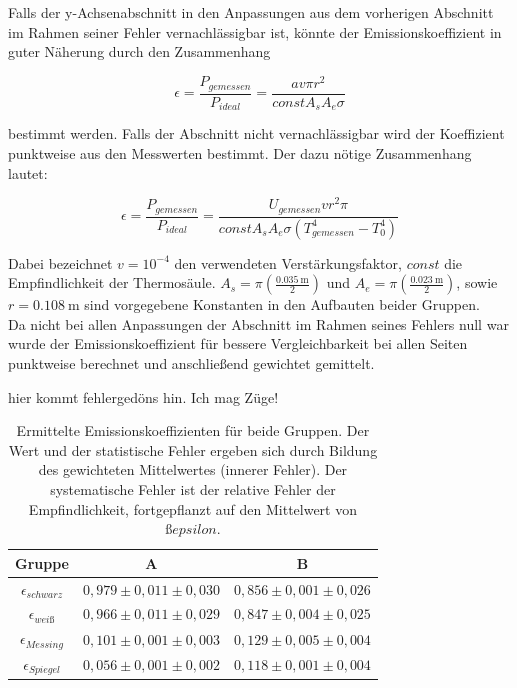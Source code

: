 \documentclass[12pt,a4paper]{article}
\begin{document}
Falls der y-Achsenabschnitt in den Anpassungen aus dem vorherigen Abschnitt im Rahmen seiner Fehler vernachlässigbar ist, könnte der Emissionskoeffizient in guter Näherung durch den Zusammenhang

\begin{equation}
\epsilon = \frac{P_{gemessen}}{P_{ideal}} = \frac{a v \pi r^2}{const A_s A_e \sigma}
\end{equation}

bestimmt werden. Falls der Abschnitt nicht vernachlässigbar wird 
der Koeffizient punktweise aus den Messwerten bestimmt. Der dazu nötige Zusammenhang lautet:

\begin{equation}
\epsilon = \frac{P_{gemessen}}{P_{ideal}} = \frac{U_{gemessen}vr^2 \pi}{const A_s A_e \sigma (T_{gemessen}^4-T_0^4)}
\end{equation}

Dabei bezeichnet $v = 10^{-4}$ den verwendeten Verstärkungsfaktor, $const$ die Empfindlichkeit der Thermosäule. $A_s = \pi \left(\frac{\SI{0,035}{\m}}{2}\right)$ und $A_e = \pi \left(\frac{\SI{0,023}{\m}}{2}\right)$, sowie $r = \SI{0,108}{\m}$ sind vorgegebene Konstanten in den Aufbauten beider Gruppen.\\

Da nicht bei allen Anpassungen der Abschnitt im Rahmen seines Fehlers null war wurde der Emissionskoeffizient für bessere Vergleichbarkeit bei allen Seiten punktweise berechnet und anschließend gewichtet gemittelt.

hier kommt fehlergedöns hin. Ich mag Züge!


\begin{table}
\centering
\begin{tabular}{|c|c|c|}
\hline
Gruppe & A & B \\
\hline
$\epsilon_{schwarz}$ & $ 0,979 \pm 0,011 \pm 0,030 $ & $ 0,856 \pm 0,001 \pm 0,026 $ \\
\hline
$\epsilon_{weiß}$ & $ 0,966 \pm 0,011 \pm 0,029 $ & $ 0,847 \pm 0,004 \pm 0,025 $ \\
\hline
$\epsilon_{Messing}$ & $ 0,101 \pm  0,001 \pm 0,003 $ & $ 0,129 \pm 0,005 \pm 0,004 $ \\
\hline
$\epsilon_{Spiegel}$ & $ 0,056 \pm 0,001 \pm 0,002 $ & $ 0,118 \pm 0,001 \pm 0,004 $ \\
\hline
\end{tabular}
\caption{Ermittelte Emissionskoeffizienten für beide Gruppen. Der Wert und der statistische Fehler ergeben sich durch Bildung des gewichteten Mittelwertes (innerer Fehler). Der systematische Fehler ist der relative Fehler der Empfindlichkeit, fortgepflanzt auf den Mittelwert von $ßepsilon$.}
\label{tab:Emission}
\end{table}
\end{document}
